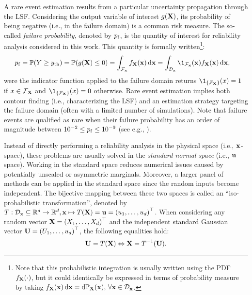 A rare event estimation results from a particular uncertainty propagation through the LSF. 
Considering the output variable of interest $g({\bf X})$, its probability of being negative (i.e., in the failure domain) is a common risk measure. 
The so-called \textit{failure probability}, denoted by $p_\mathrm{f}$, is the quantity of interest for reliability analysis considered in this work. 
This quantity is formally written\footnote{Note that this probabilistic integration is usually written using the PDF $f_{\bf X}(\cdot)$, but it could identically be expressed in terms of probability measure by taking $f_{\bf X}({\bf x}) \, \mathrm{d}{\bf x} = \mathrm{d} \mathbb{P}_{{\bf X}}({\bf x}), \, \forall {\bf x} \in \mathcal{D}_{\bf x}$.}: 
\begin{equation}
    \begin{split}
        \pf = \P(Y \geq \yth) &= \P(g(\bX) \leq 0) = \int_{\iF_\bx} f_\bX(\bx) \, \dd\bx
        = \int_{\iD_\bx} \1_{\iF_\bx}(\bx) f_\bX(\bx) \, \dd\bx,
    \end{split}
    \label{eq:pf}
\end{equation}
were the indicator function applied to the failure domain returns $\1_{\left\{\iF_{\bX}\right\}}(x) = 1$ if $x \in \mathcal{F}_{{\bf X}}$ and $\1_{\left\{\iF_{\bX}\right\}}(x) = 0$ otherwise. 
Rare event estimation implies both contour finding (i.e., characterizing the LSF) and an estimation strategy targeting the failure domain (often with a limited number of simulations). 
Note that failure events are qualified as rare when their failure probability has an order of magnitude between $10^{-2} \leq p_\mathrm{f} \leq 10^{-9}$ (see e.g., \citet{lemaire_2013}). 

Instead of directly performing a reliability analysis in the physical space (i.e., ${\bf x}$-space), these problems are usually solved in the \emph{standard normal space} (i.e., ${\bf u}$-space). 
Working in the standard space reduces numerical issues caused by potentially unscaled or asymmetric marginals. 
Moreover, a larger panel of methods can be applied in the standard space since the random inputs become independent.   
The bijective mapping between these two spaces is called an ``iso-probabilistic transformation'', 
denoted by $T: \mathcal{D}_{{\bf x}} \subseteq \mathbb{R}^d \rightarrow \mathbb{R}^d, {\bf x} \mapsto T({\bf X}) = {\bf u} = \left(u_1, \dots, u_d\right)^\top$. 
When considering any random vector ${\bf X} = \left(X_1, \dots, X_d\right)^\top$ and the independent standard Gaussian vector ${\bf U} = \left(U_1, \dots, u_d\right)^\top$, the following equalities hold:
\begin{equation}
    {\bf U} = T({\bf X}) \Leftrightarrow {\bf X} = T^{-1}({\bf U}).
\end{equation} 

